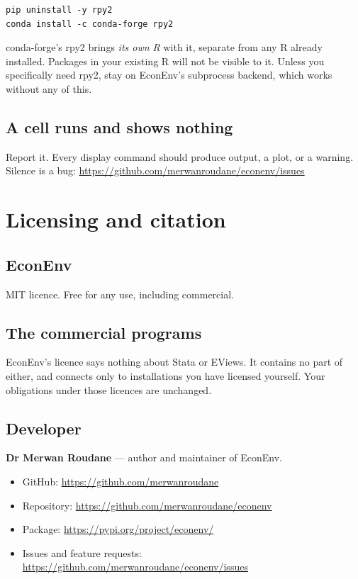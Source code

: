 \documentclass[11pt,a4paper]{report}
\begin{document}
\begin{lstlisting}
pip uninstall -y rpy2
conda install -c conda-forge rpy2
\end{lstlisting}

\begin{warn}
conda-forge's rpy2 brings \emph{its own R} with it, separate from any R already
installed. Packages in your existing R will not be visible to it. Unless you
specifically need rpy2, stay on EconEnv's subprocess backend, which works
without any of this.
\end{warn}

\section{A cell runs and shows nothing}

Report it. Every display command should produce output, a plot, or a warning.
Silence is a bug:
\url{https://github.com/merwanroudane/econenv/issues}

\chapter{Licensing and citation}

\section{EconEnv}

MIT licence. Free for any use, including commercial.

\section{The commercial programs}

EconEnv's licence says nothing about Stata or EViews. It contains no part of
either, and connects only to installations you have licensed yourself. Your
obligations under those licences are unchanged.

\section{Developer}

\textbf{Dr Merwan Roudane} --- author and maintainer of EconEnv.

\begin{itemize}
  \item GitHub: \url{https://github.com/merwanroudane}
  \item Repository: \url{https://github.com/merwanroudane/econenv}
  \item Package: \url{https://pypi.org/project/econenv/}
  \item Issues and feature requests: \url{https://github.com/merwanroudane/econenv/issues}
\end{itemize}
\end{document}
